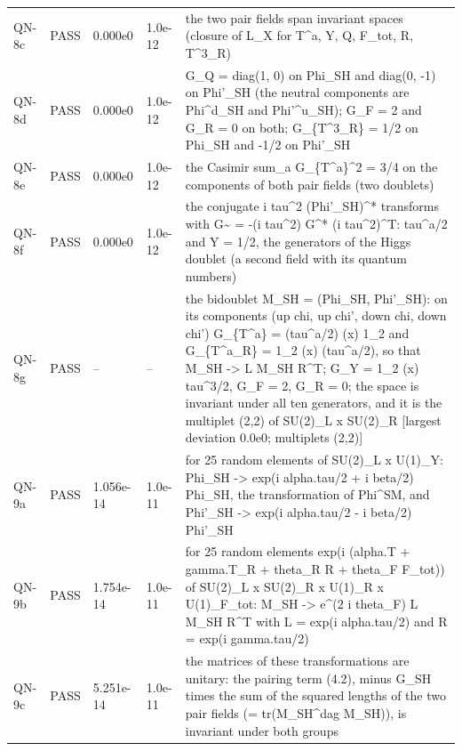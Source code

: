 \documentclass[aps,prd,onecolumn,superscriptaddress,nofootinbib,floatfix,longbibliography]{revtex4-2}
\begin{document}
\begin{longtable}{p{}p{}p{}p{}p{}}
QN-8c & PASS & 0.000e0 & 1.0e-12 & the two pair fields span invariant spaces (closure of L\_X for T\textasciicircum{}a, Y, Q, F\_tot, R, T\textasciicircum{}3\_R) \\
QN-8d & PASS & 0.000e0 & 1.0e-12 & G\_Q = diag(1, 0) on Phi\_SH and diag(0, -1) on Phi'\_SH (the neutral components are Phi\textasciicircum{}d\_SH and Phi'\textasciicircum{}u\_SH); G\_F = 2 and G\_R = 0 on both; G\_\{T\textasciicircum{}3\_R\} = 1/2 on Phi\_SH and -1/2 on Phi'\_SH \\
QN-8e & PASS & 0.000e0 & 1.0e-12 & the Casimir sum\_a G\_\{T\textasciicircum{}a\}\textasciicircum{}2 = 3/4 on the components of both pair fields (two doublets) \\
QN-8f & PASS & 0.000e0 & 1.0e-12 & the conjugate i tau\textasciicircum{}2 (Phi'\_SH)\textasciicircum{}* transforms with G\textasciitilde{} = -(i tau\textasciicircum{}2) G\textasciicircum{}* (i tau\textasciicircum{}2)\textasciicircum{}T: tau\textasciicircum{}a/2 and Y = 1/2, the generators of the Higgs doublet (a second field with its quantum numbers) \\
QN-8g & PASS & -- & -- & the bidoublet M\_SH = (Phi\_SH, Phi'\_SH): on its components (up chi, up chi', down chi, down chi') G\_\{T\textasciicircum{}a\} = (tau\textasciicircum{}a/2) (x) 1\_2 and G\_\{T\textasciicircum{}a\_R\} = 1\_2 (x) (tau\textasciicircum{}a/2), so that M\_SH -\textgreater{} L M\_SH R\textasciicircum{}T; G\_Y = 1\_2 (x) tau\textasciicircum{}3/2, G\_F = 2, G\_R = 0; the space is invariant under all ten generators, and it is the multiplet (2,2) of SU(2)\_L x SU(2)\_R [largest deviation 0.0e0; multiplets (2,2)] \\
QN-9a & PASS & 1.056e-14 & 1.0e-11 & for 25 random elements of SU(2)\_L x U(1)\_Y: Phi\_SH -\textgreater{} exp(i alpha.tau/2 + i beta/2) Phi\_SH, the transformation of Phi\textasciicircum{}SM, and Phi'\_SH -\textgreater{} exp(i alpha.tau/2 - i beta/2) Phi'\_SH \\
QN-9b & PASS & 1.754e-14 & 1.0e-11 & for 25 random elements exp(i (alpha.T + gamma.T\_R + theta\_R R + theta\_F F\_tot)) of SU(2)\_L x SU(2)\_R x U(1)\_R x U(1)\_F\_tot: M\_SH -\textgreater{} e\textasciicircum{}(2 i theta\_F) L M\_SH R\textasciicircum{}T with L = exp(i alpha.tau/2) and R = exp(i gamma.tau/2) \\
QN-9c & PASS & 5.251e-14 & 1.0e-11 & the matrices of these transformations are unitary: the pairing term (4.2), minus G\_SH times the sum of the squared lengths of the two pair fields (= tr(M\_SH\textasciicircum{}dag M\_SH)), is invariant under both groups \\

\end{longtable}
\end{document}
